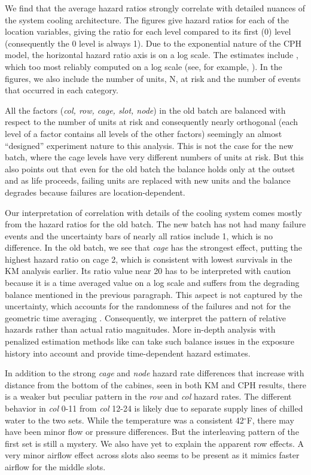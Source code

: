 We find that the average hazard ratios strongly correlate with
detailed nuances of the system cooling architecture.  The figures give
hazard ratios for each of the location variables, giving the ratio for
each level compared to its first (0) level (consequently the 0 level
is always 1). Due to the exponential nature of the CPH model, the
horizontal hazard ratio axis is on a log scale. The estimates include
, which too  most reliably
computed on a log scale (see, for example, \cite{Ostrouchov88}). In
the figures, we also include the number of units, N, at risk and the
number of events that occurred in each category.

All the factors ({\em col, row, cage, slot, node}) in the old batch
are balanced with respect to the number of units at risk and
consequently nearly orthogonal (each level of a factor contains all
levels of the other factors) seemingly an almost ``designed''
experiment nature to this analysis. This is not the case for the new
batch, where the cage levels have very different numbers of units at
risk. But this also points out that even for the old batch the balance
holds only at the outset and as life proceeds, failing units are
replaced with new units and the balance degrades because failures are
location-dependent.

Our interpretation of correlation with details of the cooling system
comes mostly from the hazard ratios for the old batch. The new batch
has not had many failure events and the uncertainty bars of nearly all
ratios include 1, which is no difference. In the old batch, we see
that {\em cage} has the strongest effect, putting the highest hazard
ratio on cage 2, which is consistent with lowest survivals in the KM
analysis earlier. Its ratio value near 20 has to be interpreted with
caution because it is a time averaged value on a log scale and suffers
from the degrading balance mentioned in the previous paragraph. This
aspect is not captured by the uncertainty, which accounts for the
randomness of the failures and not for the geometric time averaging
. Consequently, we interpret the pattern of
relative hazards rather than actual ratio magnitudes. More in-depth
analysis with penalized estimation methods like \cite{bender2019} can
take such balance issues in the exposure history into account and
provide time-dependent hazard estimates.

In addition to the strong {\em cage} and {\em node} hazard rate
differences that increase with distance from the bottom of the
cabines, seen in both KM and CPH results, there is a weaker but
peculiar pattern in the {\em row} and {\em col} hazard rates. The
different behavior in {\em col} 0-11 from {\em col} 12-24 is likely
due to separate supply lines of chilled water to the two sets. While
the temperature was a consistent 42$^\circ$F, there may have been
minor flow or pressure differences. But the interleaving pattern of
the first set is still a mystery. We also have yet to explain the
apparent row effects. A very minor airflow effect across slots also
seems to be present as it mimics faster airflow for the middle slots.
